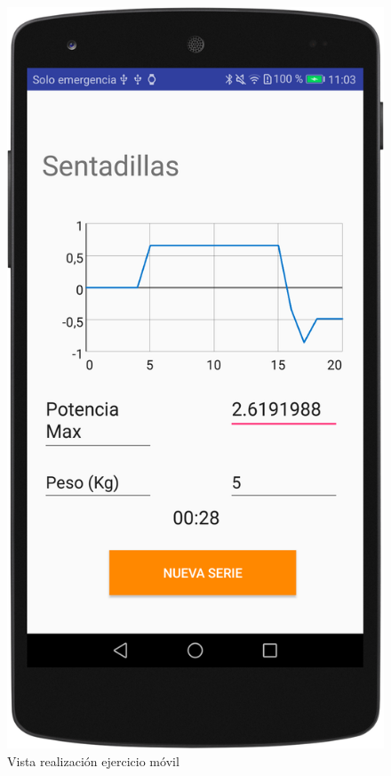 \begin{figure}[H]
	\centering
	\includegraphics[scale=0.10]{imagenes/m7.png}
	\caption{Vista realización ejercicio móvil}
	\label{Vista realización ejercicio movil}
\end{figure}
